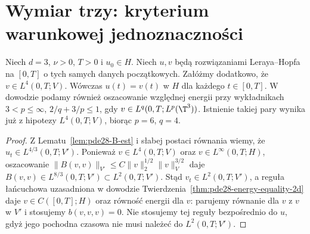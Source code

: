 \section{Wymiar trzy: kryterium warunkowej jednoznaczności}
\begin{twierdzenie}
\label{thm:pde28-serrin}
Niech $d=3$, $\nu>0$, $T>0$ i $u_0\in H$.
Niech $u,v$ będą rozwiązaniami Leraya--Hopfa na $[0,T]$
o tych samych danych początkowych. Załóżmy dodatkowo, że
$v\in L^4(0,T;V)$. Wówczas $u(t)=v(t)$ w $H$
dla każdego $t\in[0,T]$.
W dowodzie podamy również oszacowanie względnej
energii przy wykładnikach $3<p\le\infty$,
$2/q+3/p\le1$, gdy $v\in L^q(0,T;L^p(\T^3))$.
Istnienie takiej pary wynika już z hipotezy
$L^4(0,T;V)$, biorąc $p=6$, $q=4$.
\end{twierdzenie}
\begin{proof}
Z Lematu~\ref{lem:pde28-B-est} i słabej postaci
równania wiemy, że $u_t\in L^{4/3}(0,T;V')$.
Ponieważ $v\in L^4(0,T;V)$ oraz
$v\in L^\infty(0,T;H)$, oszacowanie
$\|B(v,v)\|_{V'}\le C\|v\|_2^{1/2}\|v\|_V^{3/2}$
daje $B(v,v)\in L^{8/3}(0,T;V')\subset L^2(0,T;V')$.
Stąd $v_t\in L^2(0,T;V')$, a reguła łańcuchowa uzasadniona
w dowodzie Twierdzenia~\ref{thm:pde28-energy-equality-2d}
daje $v\in C([0,T];H)$ oraz równość energii dla $v$:
parujemy równanie dla $v$ z $v$ w $V'$ i stosujemy
$b(v,v,v)=0$. Nie stosujemy tej reguły bezpośrednio
do $u$, gdyż jego pochodna czasowa nie musi należeć
do $L^2(0,T;V')$.


\end{proof}

